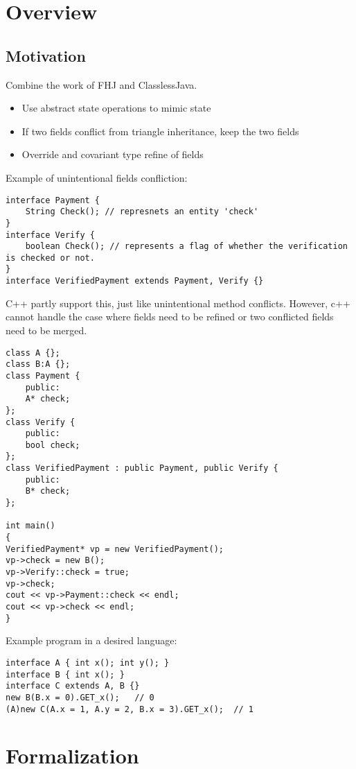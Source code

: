 \section{Overview}
\subsection{Motivation}
Combine the work of FHJ and ClasslessJava.
\begin{itemize}
	\item Use abstract state operations to mimic state
	\item If two fields conflict from triangle inheritance, keep the two fields
	\item Override and covariant type refine of fields
\end{itemize}

Example of unintentional fields confliction:
\begin{lstlisting}
interface Payment {
	String Check(); // represnets an entity 'check'
}
interface Verify {
	boolean Check(); // represents a flag of whether the verification is checked or not.
}
interface VerifiedPayment extends Payment, Verify {}
\end{lstlisting}

C++ partly support this, just like unintentional method conflicts. However, c++ cannot handle the case where fields need to be refined or two conflicted fields need to be merged.
\begin{lstlisting}
class A {};
class B:A {};
class Payment {
	public:
	A* check;
};
class Verify {
	public:
	bool check;
};
class VerifiedPayment : public Payment, public Verify {
	public:
	B* check;
};

int main()
{
VerifiedPayment* vp = new VerifiedPayment();
vp->check = new B();
vp->Verify::check = true;
vp->check;
cout << vp->Payment::check << endl;
cout << vp->check << endl;
}
\end{lstlisting}


Example program in a desired language:
\begin{lstlisting}
interface A { int x(); int y(); }
interface B { int x(); }
interface C extends A, B {}
new B(B.x = 0).GET_x();   // 0
(A)new C(A.x = 1, A.y = 2, B.x = 3).GET_x();  // 1
\end{lstlisting}

\section{Formalization}~\label{sec:formalization}

